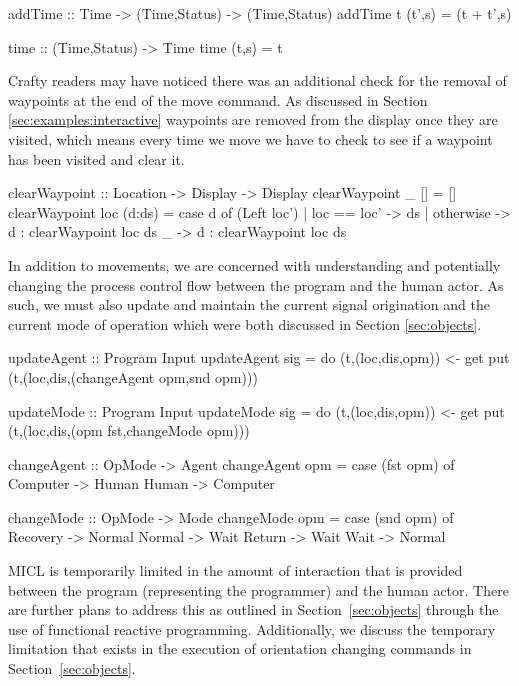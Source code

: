 \documentclass[11pt]{article}
\begin{document}
\begin{program}
addTime :: Time -> (Time,Status) -> (Time,Status)
addTime t (t',s) = (t + t',s)

time :: (Time,Status) -> Time
time (t,s) = t
\end{program}

Crafty readers may have noticed there was an additional check for the removal
of waypoints at the end of the move command. As discussed in Section
\ref{sec:examples:interactive} waypoints are removed from the display once
they are visited, which means every time we move we have to check to see if a
waypoint has been visited and clear it.

\begin{program}
clearWaypoint :: Location -> Display -> Display
clearWaypoint _   []     = []
clearWaypoint loc (d:ds) = case d of
  (Left loc')
    | loc       == loc' -> ds
    | otherwise         -> d : clearWaypoint loc ds
  _ -> d : clearWaypoint loc ds
\end{program}

In addition to movements, we are concerned with understanding and potentially
changing the process control flow between the program and the human actor. As
such, we must also update and maintain the current signal origination and the
current mode of operation which were both discussed in Section
\ref{sec:objects}.

\begin{program}
updateAgent :: Program Input
updateAgent sig = do (t,(loc,dis,opm)) <- get
                     put (t,(loc,dis,(changeAgent opm,snd opm)))

updateMode :: Program Input
updateMode sig = do (t,(loc,dis,opm)) <- get
                    put (t,(loc,dis,(opm fst,changeMode opm)))

changeAgent :: OpMode -> Agent
changeAgent opm = case (fst opm) of
  Computer -> Human
  Human    -> Computer

changeMode :: OpMode -> Mode
changeMode opm = case (snd opm) of
  Recovery -> Normal
  Normal   -> Wait
  Return   -> Wait
  Wait     -> Normal
\end{program}

MICL is temporarily limited in the amount of interaction that is provided
between the program (representing the programmer) and the human actor. There
are further plans to address this as outlined in Section~\ref{sec:objects}
through the use of functional reactive programming. Additionally, we discuss
the temporary limitation that exists in the execution of orientation changing
commands in Section~\ref{sec:objects}.
\end{document}
